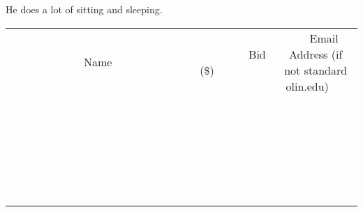 \documentclass[11pt]{article}
\begin{document}
He does a lot of sitting and sleeping.
\\[6ex]
\begin{tabular}{c c c}
~~~~~~~~~~~~~Name~~~~~~~~~~~~~ & ~~~~~~~~~Bid (\$)~~~~~~~~~  & ~~~Email Address (if not standard olin.edu)~~~\\
 & & \\
\hline
 & & \\
\hline
 & & \\
\hline
 & & \\
\hline
 & & \\
\hline
 & & \\
\hline
 & & \\
\hline
 & & \\
\hline
 & & \\
\hline
 & & \\
\hline
 & & \\
\hline
 & & \\
\hline
 & & \\
\hline
 & & \\
\hline
 & & \\
\hline
 & & \\
\hline
 & & \\
\hline
 & & \\
\hline
 & & \\
\hline
 & & \\
\hline
 & & \\
\hline
 & & \\
\hline
 & & \\
\hline
 & & \\
\hline
 & & \\
\hline
 & & \\
\hline
\end{tabular}
\newpage
\end{document}
